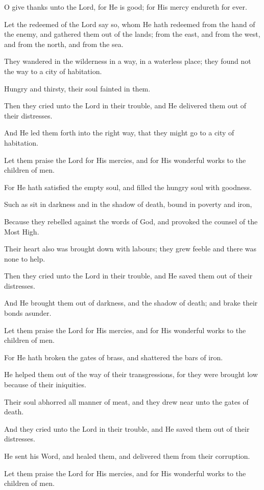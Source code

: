 O give thanks unto the Lord, for He is good; for His mercy endureth for ever.

Let the redeemed of the Lord say so, whom He hath redeemed from the hand of the enemy, and gathered them out of the lands; from the east, and from the west, and from the north, and from the sea.

They wandered in the wilderness in a way, in a waterless place; they found not the way to a city of habitation.

Hungry and thirsty, their soul fainted in them.

Then they cried unto the Lord in their trouble, and He delivered them out of their distresses.

And He led them forth into the right way, that they might go to a city of habitation.

Let them praise the Lord for His mercies, and for His wonderful works to the children of men.

For He hath satisfied the empty soul, and filled the hungry soul with goodness.

Such as sit in darkness and in the shadow of death, bound in poverty and iron,

Because they rebelled against the words of God, and provoked the counsel of the Most High.

Their heart also was brought down with labours; they grew feeble and there was none to help.

Then they cried unto the Lord in their trouble, and He saved them out of their distresses.

And He brought them out of darkness, and the shadow of death; and brake their bonds asunder.

Let them praise the Lord for His mercies, and for His wonderful works to the children of men.

For He hath broken the gates of brass, and shattered the bars of iron.

He helped them out of the way of their transgressions, for they were brought low because of their iniquities.

Their soul abhorred all manner of meat, and they drew near unto the gates of death.

And they cried unto the Lord in their trouble, and He saved them out of their distresses.

He sent his Word, and healed them, and delivered them from their corruption.

Let them praise the Lord for His mercies, and for His wonderful works to the children of men.

